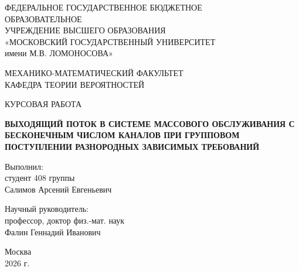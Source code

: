 \documentclass[12pt]{article}
\theoremstyle{plain}
\theoremstyle{definition}
\theoremstyle{remark}
\begin{document}
\begin{titlepage}
\begin{center}
    {\Large 
    ФЕДЕРАЛЬНОЕ ГОСУДАРСТВЕННОЕ БЮДЖЕТНОЕ \\
    ОБРАЗОВАТЕЛЬНОЕ \\
    УЧРЕЖДЕНИЕ ВЫСШЕГО ОБРАЗОВАНИЯ \\
    \vspace{0.5em} 
    «МОСКОВСКИЙ ГОСУДАРСТВЕННЫЙ УНИВЕРСИТЕТ \\
    имени М.В. ЛОМОНОСОВА»

    \vspace{3em} 

    МЕХАНИКО-МАТЕМАТИЧЕСКИЙ ФАКУЛЬТЕТ \\
    \vspace{1.5em} 
    КАФЕДРА ТЕОРИИ ВЕРОЯТНОСТЕЙ
    } 
\end{center}

\vspace{2em} 

\begin{center}
   \Large КУРСОВАЯ РАБОТА
\end{center} 

\begin{center}
    \Large 
    \textbf{ВЫХОДЯЩИЙ ПОТОК В СИСТЕМЕ МАССОВОГО ОБСЛУЖИВАНИЯ С БЕСКОНЕЧНЫМ ЧИСЛОМ КАНАЛОВ ПРИ ГРУППОВОМ ПОСТУПЛЕНИИ РАЗНОРОДНЫХ ЗАВИСИМЫХ ТРЕБОВАНИЙ}
\end{center}

\vfill


\noindent\hspace*{0.47\textwidth}
\begin{minipage}[t]{0.47\textwidth} 
    \raggedright 
    
    \large Выполнил: \\
    \large студент 408 группы \\
    \large Салимов Арсений Евгеньевич
    \vspace{2.5em} 

    \large Научный руководитель: \\ 
    \large профессор, доктор физ.-мат. наук \\ 
    \large Фалин Геннадий Иванович 
    \vspace{2.5em} 
    
\end{minipage}

\vspace*{\fill} 

\begin{center}
    Москва\\ \vspace{1em} 2026 г.
\end{center}

\end{titlepage}
\end{document}
